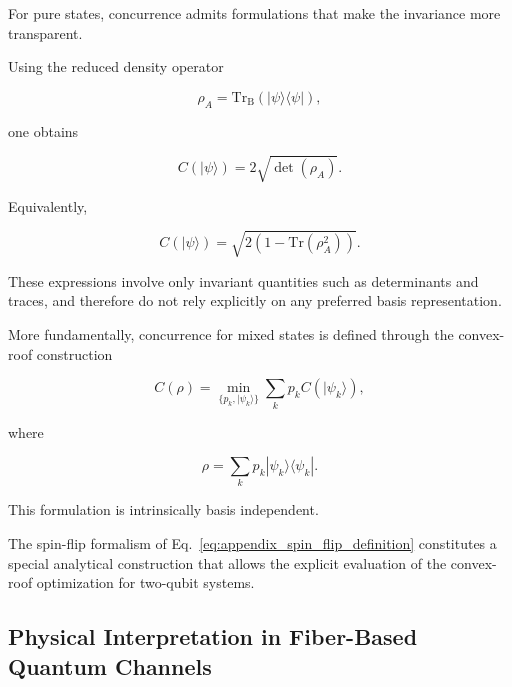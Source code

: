 For pure states, concurrence admits formulations that make the invariance more transparent.

Using the reduced density operator

\[
\rho_A
=
\mathrm{Tr_B}
\left(
|\psi\rangle\langle\psi|
\right),
\]

one obtains

\begin{equation}
C(|\psi\rangle)
=
2\sqrt{\det(\rho_A)}.
\label{eq:concurrence_determinant_appendix}
\end{equation}

Equivalently,

\begin{equation}
C(|\psi\rangle)
=
\sqrt{
2
\left(
1-\mathrm{Tr}(\rho_A^2)
\right)
}.
\label{eq:concurrence_purity_appendix}
\end{equation}

These expressions involve only invariant quantities such as determinants and traces, and therefore do not rely explicitly on any preferred basis representation.

\medskip

More fundamentally, concurrence for mixed states is defined through the convex-roof construction

\begin{equation}
C(\rho)
=
\min_{\{p_k,|\psi_k\rangle\}}
\sum_k
p_k
C(|\psi_k\rangle),
\label{eq:convex_roof_concurrence_appendix}
\end{equation}

where

\begin{equation}
\rho
=
\sum_k
p_k
|\psi_k\rangle\langle\psi_k|.
\label{eq:convex_decomposition_appendix}
\end{equation}

This formulation is intrinsically basis independent.

The spin-flip formalism of Eq.~\eqref{eq:appendix_spin_flip_definition} constitutes a special analytical construction that allows the explicit evaluation of the convex-roof optimization for two-qubit systems.


\subsection*{Physical Interpretation in Fiber-Based Quantum Channels}

